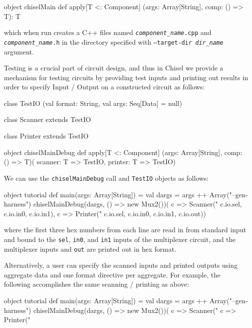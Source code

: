 \documentclass[10pt,twocolumn]{article}
\def\code#1{{\small\tt #1}}
\begin{document}
\begin{scala}
object chiselMain {
  def apply[T <: Component]
    (args: Array[String], comp: () => T): T
}
\end{scala}

\noindent
which when run creates a C++ files named
\code{{\it component\_name}.cpp} and \code{{\it component\_name}.h} in
the directory specified with
\code{--target-dir {\it dir\_name}} argument.

Testing is a crucial part of circuit design, 
and thus in Chisel we provide a mechanism for
testing circuits by providing test inputs and printing out results
in order to specify Input / Output on a constructed circuit as follows:

\begin{scala}
class TestIO
  (val format: String, val args: Seq[Data] = null)

class Scanner extends TestIO

class Printer extends TestIO

object chiselMainDebug {
  def apply[T <: Component]
    (args: Array[String], comp: () => T)(
     scanner: T => TestIO, 
     printer: T => TestIO)
}
\end{scala}

\noindent

We can use the \code{chiselMainDebug} call and \code{TestIO} objects as follows:

\begin{scala}
object tutorial {
  def main(args: Array[String]) = {
    val dargs = args ++ Array("--gen-harness")
    chiselMainDebug(dargs, () => new Mux2())(
      c => Scanner("%
                   c.io.sel, c.io.in0, c.io.in1),
      c => Printer("%
                   c.io.sel, c.io.in0, c.io.in1, 
                   c.io.out))
  }
}
\end{scala}

\noindent
where the first three hex numbers from each line are read in from
standard input and bound to the \code{sel}, \code{in0},  and
\code{in1} inputs of the multiplexer circuit, and the multiplexer
inputs and \code{out} are printed out in hex format.  

Alternatively, a user can specify the scanned inputs and printed
outputs using aggregate data and one format directive per aggregate.  
For example, the following accomplishes the same scanning / printing
as above:

\begin{scala}
object tutorial {
  def main(args: Array[String]) = {
    val dargs = args ++ Array("--gen-harness")
    chiselMainDebug(dargs, () => new Mux2())(
      c => Scanner("%
      c => Printer("%
  }
}
\end{scala}
 
\end{document}
